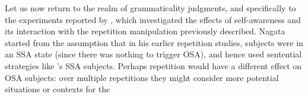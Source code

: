 Let us now return to the realm of grammaticality judgments, and specifically to the experiments reported by \citet{Nagata1989a}, which investigated the effects of self-awareness and its interaction with the repetition manipulation previously described. Nagata started from the assumption that in his earlier repetition studies, subjects were in an SSA state (since there was nothing to trigger OSA), and hence used sentential strategies like \citeauthor{CarrollEtAl1981}'s SSA subjects. Perhaps repetition would have a different effect on OSA subjects: over multiple repetitions they might consider more potential situations or contexts for the

